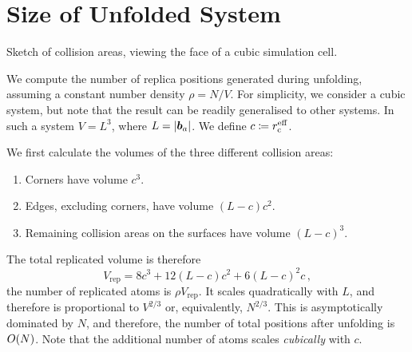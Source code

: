 
\section{Size of Unfolded System}
\label{sec:si-unfolding_n}

\begin{marginfigure}
  \centering
  

  \caption{
  Sketch of collision areas, viewing the face of a cubic simulation cell.
  }
  \label{fig:si-areas}
\end{marginfigure}

We compute the number of replica positions generated during unfolding, assuming a constant number density $\rho = N/V$. For simplicity, we consider a cubic system, but note that the result can be readily generalised to other systems. In such a system $V = L^3$, where $L = |\boldsymbol{b}_a|$. We define $c \coloneqq r_{\text{c}}^{\text{eff}}$.

We first calculate the volumes of the three different collision areas:
\begin{enumerate}[itemsep=0pt,topsep=0.5\baselineskip]
    \item Corners have volume $c^3$.
    \item Edges, excluding corners, have volume $(L-c)c^2$.
    \item Remaining collision areas on the surfaces have volume $(L-c)^3$.
\end{enumerate}
The total replicated volume is therefore
\begin{equation}
    V_{\text{rep}} = 8 c^3 + 12 (L-c)c^2 + 6 (L-c)^2 c \, ,
\end{equation}
the number of replicated atoms is $\rho V_{\text{rep}}$. It scales quadratically with $L$, and therefore is proportional to $V^{2/3}$ or, equivalently, $N^{2/3}$. This is asymptotically dominated by $N$, and therefore, the number of total positions after unfolding is $O(N)$.
Note that the additional number of atoms scales \emph{cubically} with $c$.

